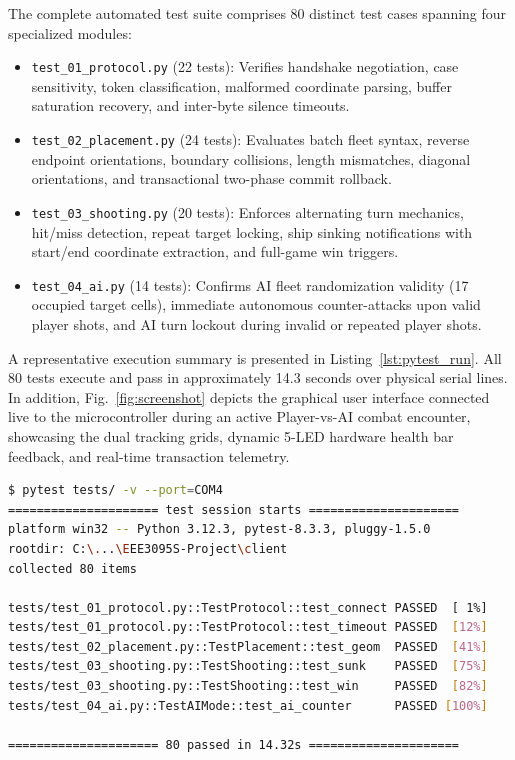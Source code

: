 The complete automated test suite comprises 80 distinct test cases spanning four specialized modules:
\begin{itemize}
    \item \texttt{test\_01\_protocol.py} (22 tests): Verifies handshake negotiation, case sensitivity, token classification, malformed coordinate parsing, buffer saturation recovery, and inter-byte silence timeouts.
    \item \texttt{test\_02\_placement.py} (24 tests): Evaluates batch fleet syntax, reverse endpoint orientations, boundary collisions, length mismatches, diagonal orientations, and transactional two-phase commit rollback.
    \item \texttt{test\_03\_shooting.py} (20 tests): Enforces alternating turn mechanics, hit/miss detection, repeat target locking, ship sinking notifications with start/end coordinate extraction, and full-game win triggers.
    \item \texttt{test\_04\_ai.py} (14 tests): Confirms AI fleet randomization validity (17 occupied target cells), immediate autonomous counter-attacks upon valid player shots, and AI turn lockout during invalid or repeated player shots.
\end{itemize}

A representative execution summary is presented in Listing~\ref{lst:pytest_run}. All 80 tests execute and pass in approximately 14.3 seconds over physical serial lines. In addition, Fig.~\ref{fig:screenshot} depicts the graphical user interface connected live to the microcontroller during an active Player-vs-AI combat encounter, showcasing the dual tracking grids, dynamic 5-LED hardware health bar feedback, and real-time transaction telemetry.

\begin{lstlisting}[language=bash, caption={Automated test execution summary running against the physical STM32F051R8 hardware.}, label={lst:pytest_run}]
$ pytest tests/ -v --port=COM4
===================== test session starts =====================
platform win32 -- Python 3.12.3, pytest-8.3.3, pluggy-1.5.0
rootdir: C:\...\EEE3095S-Project\client
collected 80 items

tests/test_01_protocol.py::TestProtocol::test_connect PASSED  [ 1%]
tests/test_01_protocol.py::TestProtocol::test_timeout PASSED  [12%]
tests/test_02_placement.py::TestPlacement::test_geom  PASSED  [41%]
tests/test_03_shooting.py::TestShooting::test_sunk    PASSED  [75%]
tests/test_03_shooting.py::TestShooting::test_win     PASSED  [82%]
tests/test_04_ai.py::TestAIMode::test_ai_counter      PASSED [100%]

===================== 80 passed in 14.32s =====================
\end{lstlisting}

